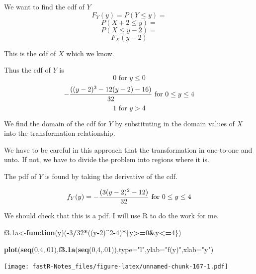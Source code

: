 \documentclass[]{book}
\newenvironment{Shaded}{\begin{snugshade}}{\end{snugshade}}
\newcommand{\KeywordTok}[1]{\textcolor[rgb]{0.13,0.29,0.53}{\textbf{#1}}}
\newcommand{\DataTypeTok}[1]{\textcolor[rgb]{0.13,0.29,0.53}{#1}}
\newcommand{\DecValTok}[1]{\textcolor[rgb]{0.00,0.00,0.81}{#1}}
\newcommand{\StringTok}[1]{\textcolor[rgb]{0.31,0.60,0.02}{#1}}
\newcommand{\ControlFlowTok}[1]{\textcolor[rgb]{0.13,0.29,0.53}{\textbf{#1}}}
\newcommand{\OperatorTok}[1]{\textcolor[rgb]{0.81,0.36,0.00}{\textbf{#1}}}
\newcommand{\NormalTok}[1]{#1}
\theoremstyle{definition}
\theoremstyle{definition}
\theoremstyle{definition}
\theoremstyle{remark}
\begin{document}
We want to find the cdf of \(Y\) \[F_{Y}(y)=P(Y \leq y)=\]
\[P(X+2 \leq y)=\] \[P(X \leq y-2)=\] \[F_{X}(y-2)\]

This is the cdf of \(X\) which we know.

Thus the cdf of \(Y\) is \[0 \mbox{ for }y \leq 0\]
\[-{((y-2)^3-12(y-2)-16) \over 32} \mbox{ for } 0 \leq y \leq 4\]
\[1 \mbox{ for } y>4\]

We find the domain of the cdf for \(Y\) by substituting in the domain
values of \(X\) into the transformation relationship.

We have to be careful in this approach that the transformation in
one-to-one and unto. If not, we have to divide the problem into regions
where it is.

The pdf of \(Y\) is found by taking the derivative of the cdf.

\[f_{Y}(y)=-{(3(y-2)^2-12) \over 32} \mbox{ for } 0 \leq y \leq 4\]

We should check that this is a pdf. I will use R to do the work for me.

\begin{Shaded}
\begin{Highlighting}[]
\NormalTok{f3.1a<-}\ControlFlowTok{function}\NormalTok{(y)(}\OperatorTok{-}\DecValTok{3}\OperatorTok{/}\DecValTok{32}\OperatorTok{*}\NormalTok{((y}\OperatorTok{-}\DecValTok{2}\NormalTok{)}\OperatorTok{^}\DecValTok{2}\OperatorTok{-}\DecValTok{4}\NormalTok{)}\OperatorTok{*}\NormalTok{\{y}\OperatorTok{>=}\DecValTok{0}\OperatorTok{&}\NormalTok{y}\OperatorTok{<=}\DecValTok{4}\NormalTok{\})}
\end{Highlighting}
\end{Shaded}

\begin{Shaded}
\begin{Highlighting}[]
\KeywordTok{plot}\NormalTok{(}\KeywordTok{seq}\NormalTok{(}\DecValTok{0}\NormalTok{,}\DecValTok{4}\NormalTok{,.}\DecValTok{01}\NormalTok{),}\KeywordTok{f3.1a}\NormalTok{(}\KeywordTok{seq}\NormalTok{(}\DecValTok{0}\NormalTok{,}\DecValTok{4}\NormalTok{,.}\DecValTok{01}\NormalTok{)),}\DataTypeTok{type=}\StringTok{"l"}\NormalTok{,}\DataTypeTok{ylab=}\StringTok{"f(y)"}\NormalTok{,}\DataTypeTok{xlab=}\StringTok{"y"}\NormalTok{)}
\end{Highlighting}
\end{Shaded}

\texttt{[image: fastR-Notes\_files/figure-latex/unnamed-chunk-167-1.pdf]}

\begin{Shaded}
\end{Shaded}
\end{document}
